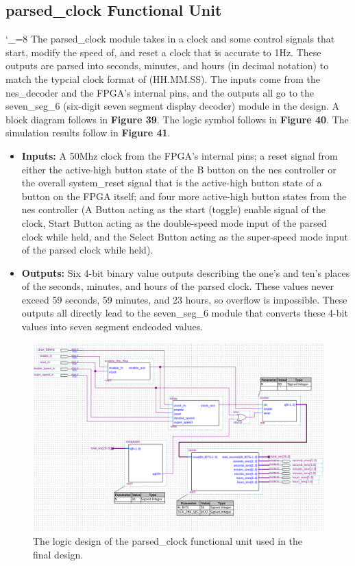 \documentclass[a4paper]{article}
\begin{document}
\subsection{parsed\_clock Functional Unit}
\catcode`_=8
The parsed\_clock module takes in a clock and some control signals that start, modify the speed of, and reset a clock that is accurate to 1Hz. These outputs are parsed into seconds, minutes, and hours (in decimal notation) to match the typcial clock format of (HH.MM.SS). The inputs come from the nes\_decoder and the FPGA's internal pins, and the outputs all go to the seven\_seg\_6 (six-digit seven segment display decoder) module in the design. A block diagram follows in \textbf{Figure 39}.  The logic symbol follows in \textbf{Figure 40}.  The simulation results follow in \textbf{Figure 41}.
\begin{itemize}
\item \textbf{Inputs:  } A 50Mhz clock from the FPGA's internal pins; a reset signal from either the active-high button state of the B button on the nes controller or the overall system\_reset signal that is the active-high button state of a button on the FPGA itself; and four more active-high button states from the nes controller (A Button acting as the start (toggle) enable signal of the clock, Start Button acting as the double-speed mode input of the parsed clock while held, and the Select Button acting as the super-speed mode input of the parsed clock while held).
\item \textbf{Outputs: } Six 4-bit binary value outputs describing the one's and ten's places of the seconds, minutes, and hours of the parsed clock. These values never exceed 59 seconds, 59 minutes, and 23 hours, so overflow is impossible. These outputs all directly lead to the seven\_seg\_6 module that converts these 4-bit values into seven segment endcoded values.
\end{itemize}
\begin{figure}[h]
\centering
\includegraphics[width=.8\textwidth]{functional_units/parsed_clock/parsed_clock_block.png}
\caption{The logic design of the parsed\_clock functional unit used in the final design.}
\end{figure}
\end{document}
